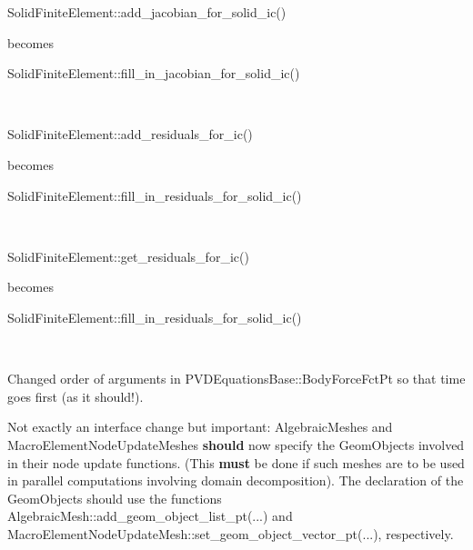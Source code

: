 \begin{DoxyItemize}
\item 
\begin{DoxyCode}
SolidFiniteElement::add\_jacobian\_for\_solid\_ic() 
\end{DoxyCode}
 becomes 
\begin{DoxyCode}
SolidFiniteElement::fill\_in\_jacobian\_for\_solid\_ic()
\end{DoxyCode}
 ~\newline
~\newline

\item 
\begin{DoxyCode}
SolidFiniteElement::add\_residuals\_for\_ic()
\end{DoxyCode}
 becomes 
\begin{DoxyCode}
SolidFiniteElement::fill\_in\_residuals\_for\_solid\_ic()
\end{DoxyCode}
 ~\newline
~\newline

\item 
\begin{DoxyCode}
SolidFiniteElement::get\_residuals\_for\_ic()
\end{DoxyCode}
 becomes 
\begin{DoxyCode}
SolidFiniteElement::fill\_in\_residuals\_for\_solid\_ic()
\end{DoxyCode}
 ~\newline
~\newline

\item Changed order of arguments in {\ttfamily P\+V\+D\+Equations\+Base\+::\+Body\+Force\+Fct\+Pt} so that time goes first (as it should!). ~\newline
~\newline

\item Not exactly an interface change but important\+: {\ttfamily Algebraic\+Meshes} and {\ttfamily Macro\+Element\+Node\+Update\+Meshes} {\bfseries should} now specify the {\ttfamily Geom\+Objects} involved in their node update functions. (This {\bfseries must} be done if such meshes are to be used in parallel computations involving domain decomposition). The declaration of the {\ttfamily Geom\+Objects} should use the functions {\ttfamily Algebraic\+Mesh\+::add\+\_\+geom\+\_\+object\+\_\+list\+\_\+pt}(...) and {\ttfamily Macro\+Element\+Node\+Update\+Mesh\+::set\+\_\+geom\+\_\+object\+\_\+vector\+\_\+pt}(...), respectively. ~\newline
~\newline


\end{DoxyItemize}
